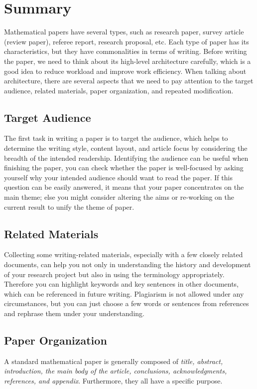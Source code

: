 \section{Summary}
Mathematical papers have several types, such as research paper, survey article (review paper), referee report, research proposal, etc. Each type of paper has its characteristics, but they have commonalities in terms of writing. Before writing the paper, we need to think about its high-level architecture carefully, which is a good idea to reduce workload and improve work efficiency. When talking about architecture, there are several aspects that we need to pay attention to the target audience, related materials, paper organization, and repeated modification.


\subsection{Target Audience}
The first task in writing a paper is to target the audience, which helps to determine the writing style, content layout, and article focus by considering the breadth of the intended readership. Identifying the audience can be useful when finishing the paper, you can check whether the paper is well-focused by asking yourself why your intended audience should want to read the paper. If this question can be easily answered, it means that your paper concentrates on the main theme; else you might consider altering the aims or re-working on the current result to unify the theme of paper.


\subsection{Related Materials}
Collecting some writing-related materials, especially with a few closely related documents, can help you not only in understanding the history and development of your research project but also in using the terminology appropriately. Therefore you can highlight keywords and key sentences in other documents, which can be referenced in future writing. Plagiarism is not allowed under any circumstances, but you can just choose a few words or sentences from references and rephrase them under your understanding.


\subsection{Paper Organization}
A standard mathematical paper is generally composed of \emph{title, abstract, introduction, the main body of the article, conclusions, acknowledgments, references, and appendix}. Furthermore, they all have a specific purpose.
